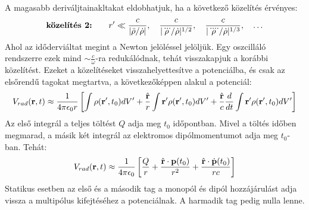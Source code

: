 \documentclass[a4paper,12pt]{article}
\begin{document}
A magasabb deriváljtainakltakat eldobhatjuk, ha a következő közelítés érvényes:
\begin{equation}
    \text{\textbf{közelítés 2:}} \qquad r' \ll \frac{c}{|\ddot{\rho}/\dot{\rho}|}, \quad \frac{c}{|\dddot{\rho}/\dot{\rho}|^{1/2}}, \quad \frac{c}{|\ddddot{\rho}/\dot{\rho}|^{1/3}}, \quad \ldots
\end{equation}
Ahol az időderviáltat megint a Newton jelöléssel jelöljük. Egy oszcilláló rendszerre ezek mind $\sim \frac{c}{\omega}$-ra redukálódnak, tehát visszakapjuk a korábbi közelítést.
Ezeket a közelítéseket visszahelyettesítve a potenciálba, és csak az elsőrendű tagokat megtartva, a következőképpen alakul a potenciál:
\begin{equation}
    V_{rad}(\bold{r}, t) \approx \frac{1}{4 \pi \epsilon_0 r} \left[\int \rho(\bold{r'}, t_0) dV' + \frac{\hat{\bold{r}}}{r} \int \bold{r'} \rho(\bold{r'}, t_0) dV' + \frac{\hat{\bold{r}}}{c} \frac{d}{dt} \int \bold{r'} \rho(\bold{r'}, t_0) dV' \right]
\end{equation}
Az első integrál a teljes töltést $Q$ adja meg $t_0$ időpontban. Mivel a töltés időben megmarad, a másik két integrál az elektromos dipólmomentumot adja meg $t_0$-ban. Tehát:
\begin{equation}
    V_{rad}(\bold{r}, t) \approx \frac{1}{4 \pi \epsilon_0} \left[ \frac{Q}{r} + \frac{\hat{\bold{r}} \cdot \bold{p}(t_0)}{r^2} + \frac{\hat{\bold{r}} \cdot \dot{\bold{p}}(t_0)}{rc} \right]
\end{equation} 
Statikus esetben az első és a második tag a monopól és dipól hozzájárulást adja vissza a multipólus kifejtéséhez a potenciálnak. A harmadik tag pedig nulla lenne.
\end{document}
